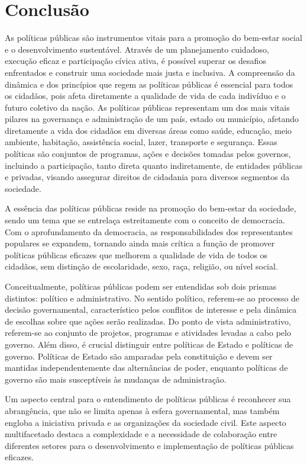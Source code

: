 \documentclass[
   article,       
   12pt,          
   oneside,       
   a4paper,       
   english,       
   brazil,        
   sumario=tradicional
   ]{abntex2}
\begin{document}
\section{Conclusão}
    As políticas públicas são instrumentos vitais para a promoção do bem-estar social e o desenvolvimento sustentável. Através de um planejamento cuidadoso, execução eficaz e participação cívica ativa, é possível superar os desafios enfrentados e construir uma sociedade mais justa e inclusiva. A compreensão da dinâmica e dos princípios que regem as políticas públicas é essencial para todos os cidadãos, pois afeta diretamente a qualidade de vida de cada indivíduo e o futuro coletivo da nação.
As políticas públicas representam um dos mais vitais pilares na governança e administração de um país, estado ou município, afetando diretamente a vida dos cidadãos em diversas áreas como saúde, educação, meio ambiente, habitação, assistência social, lazer, transporte e segurança. Essas políticas são conjuntos de programas, ações e decisões tomadas pelos governos, incluindo a participação, tanto direta quanto indiretamente, de entidades públicas e privadas, visando assegurar direitos de cidadania para diversos segmentos da sociedade.

A essência das políticas públicas reside na promoção do bem-estar da sociedade, sendo um tema que se entrelaça estreitamente com o conceito de democracia. Com o aprofundamento da democracia, as responsabilidades dos representantes populares se expandem, tornando ainda mais crítica a função de promover políticas públicas eficazes que melhorem a qualidade de vida de todos os cidadãos, sem distinção de escolaridade, sexo, raça, religião, ou nível social.

Conceitualmente, políticas públicas podem ser entendidas sob dois prismas distintos: político e administrativo. No sentido político, referem-se ao processo de decisão governamental, característico pelos conflitos de interesse e pela dinâmica de escolhas sobre que ações serão realizadas. Do ponto de vista administrativo, referem-se ao conjunto de projetos, programas e atividades levadas a cabo pelo governo. Além disso, é crucial distinguir entre políticas de Estado e políticas de governo. Políticas de Estado são amparadas pela constituição e devem ser mantidas independentemente das alternâncias de poder, enquanto políticas de governo são mais susceptíveis às mudanças de administração.

Um aspecto central para o entendimento de políticas públicas é reconhecer sua abrangência, que não se limita apenas à esfera governamental, mas também engloba a iniciativa privada e as organizações da sociedade civil. Este aspecto multifacetado destaca a complexidade e a necessidade de colaboração entre diferentes setores para o desenvolvimento e implementação de políticas públicas eficazes.
\end{document}
